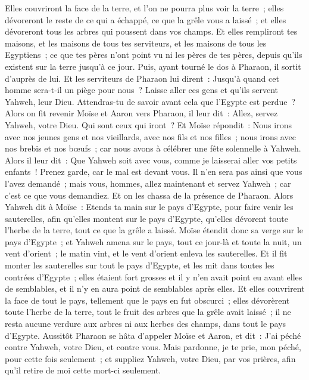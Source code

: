 \begin{multicols}{2}
Elles couvriront la face de la terre, et l'on ne pourra plus voir la terre~; elles dévoreront le reste de ce qui a échappé, ce que la grêle vous a laissé~; et elles dévoreront tous les arbres qui poussent dans vos champs.
Et elles rempliront tes maisons, et les maisons de tous tes serviteurs, et les maisons de tous les Egyptiens~; ce que tes pères n'ont point vu ni les pères de tes pères, depuis qu'ils existent sur la terre jusqu'à ce jour. Puis, ayant tourné le dos à Pharaon, il sortit d'auprès de lui.
Et les serviteurs de Pharaon lui dirent~: Jusqu'à quand cet homme sera-t-il un piège pour nous~? Laisse aller ces gens et qu'ils servent Yahweh, leur Dieu. Attendras-tu de savoir avant cela que l'Egypte est perdue~?
Alors on fit revenir Moïse et Aaron vers Pharaon, il leur dit~: Allez, servez Yahweh, votre Dieu. Qui sont ceux qui iront~?
 Et Moïse répondit~: Nous irons avec nos jeunes gens et nos vieillards, avec nos fils et nos filles~; nous irons avec nos brebis et nos bœufs~; car nous avons à célébrer une fête solennelle à Yahweh.
Alors il leur dit~: Que Yahweh soit avec vous, comme je laisserai aller vos petits enfants~! Prenez garde, car le mal est devant vous.
Il n'en sera pas ainsi que vous l'avez demandé~; mais vous, hommes, allez maintenant et servez Yahweh~; car c'est ce que vous demandiez. Et on les chassa de la présence de Pharaon.
Alors Yahweh dit à Moïse~: Etends ta main sur le pays d'Egypte, pour faire venir les sauterelles, afin qu'elles montent sur le pays d'Egypte, qu'elles dévorent toute l'herbe de la terre, tout ce que la grêle a laissé.
Moïse étendit donc sa verge sur le pays d'Egypte~; et Yahweh amena sur le pays, tout ce jour-là et toute la nuit, un vent d'orient~; le matin vint, et le vent d'orient enleva les sauterelles.
Et il fit monter les sauterelles sur tout le pays d'Egypte, et les mit dans toutes les contrées d'Egypte~; elles étaient fort grosses et il y n'en avait point eu avant elles de semblables, et il n'y en aura point de semblables après elles.
Et elles couvrirent la face de tout le pays, tellement que le pays en fut obscurci~; elles dévorèrent toute l'herbe de la terre, tout le fruit des arbres que la grêle avait laissé~; il ne resta aucune verdure aux arbres ni aux herbes des champs, dans tout le pays d'Egypte.
Aussitôt Pharaon se hâta d'appeler Moïse et Aaron, et dit~: J'ai péché contre Yahweh, votre Dieu, et contre vous.
Mais pardonne, je te prie, mon péché, pour cette fois seulement~; et suppliez Yahweh, votre Dieu, par vos prières, afin qu'il retire de moi cette mort-ci seulement.

\end{multicols}
